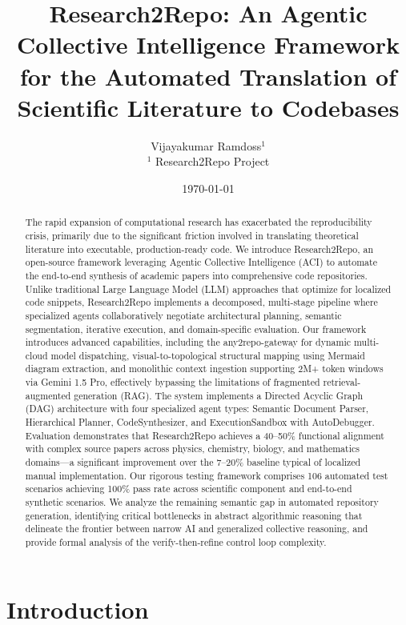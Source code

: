 \documentclass[10pt]{article}
\title{Research2Repo: An Agentic Collective Intelligence Framework for the Automated Translation of Scientific Literature to Codebases}
\author{
Vijayakumar Ramdoss$^{1}$ \\
\small $^{1}$ Research2Repo Project
}
\date{\today}
\begin{document}
\maketitle

\begin{abstract}
The rapid expansion of computational research has exacerbated the reproducibility crisis, primarily due to the significant friction involved in translating theoretical literature into executable, production-ready code. We introduce Research2Repo, an open-source framework leveraging Agentic Collective Intelligence (ACI) to automate the end-to-end synthesis of academic papers into comprehensive code repositories. Unlike traditional Large Language Model (LLM) approaches that optimize for localized code snippets, Research2Repo implements a decomposed, multi-stage pipeline where specialized agents collaboratively negotiate architectural planning, semantic segmentation, iterative execution, and domain-specific evaluation. Our framework introduces advanced capabilities, including the any2repo-gateway for dynamic multi-cloud model dispatching, visual-to-topological structural mapping using Mermaid diagram extraction, and monolithic context ingestion supporting 2M+ token windows via Gemini 1.5 Pro, effectively bypassing the limitations of fragmented retrieval-augmented generation (RAG). The system implements a Directed Acyclic Graph (DAG) architecture with four specialized agent types: Semantic Document Parser, Hierarchical Planner, CodeSynthesizer, and ExecutionSandbox with AutoDebugger. Evaluation demonstrates that Research2Repo achieves a 40--50\% functional alignment with complex source papers across physics, chemistry, biology, and mathematics domains—a significant improvement over the 7--20\% baseline typical of localized manual implementation. Our rigorous testing framework comprises 106 automated test scenarios achieving 100\% pass rate across scientific component and end-to-end synthetic scenarios. We analyze the remaining semantic gap in automated repository generation, identifying critical bottlenecks in abstract algorithmic reasoning that delineate the frontier between narrow AI and generalized collective reasoning, and provide formal analysis of the verify-then-refine control loop complexity.
\end{abstract}

\section{Introduction}
\end{document}
